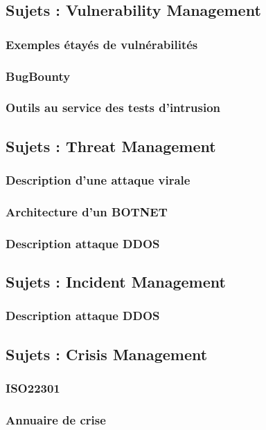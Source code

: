 \subsection{Sujets : Vulnerability Management}
\subsubsection{Exemples étayés de vulnérabilités}
\subsubsection{BugBounty}
\subsubsection{Outils au service des tests d'intrusion}



\subsection{Sujets : Threat Management}
\subsubsection{Description d'une attaque virale}
\subsubsection{Architecture d'un BOTNET}
\subsubsection{Description attaque DDOS}


\subsection{Sujets : Incident Management}
\subsubsection{Description attaque DDOS}


\subsection{Sujets : Crisis Management}
\subsubsection{ISO22301}
\subsubsection{Annuaire de crise}





